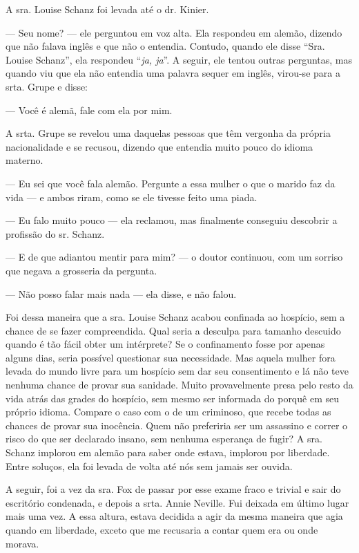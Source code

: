 A sra. Louise Schanz foi levada até o dr. Kinier.

--- Seu nome? --- ele perguntou em voz alta. Ela respondeu em alemão,
dizendo que não falava inglês e que não o entendia. Contudo, quando ele
disse ``Sra. Louise Schanz'', ela respondeu ``\emph{ja, ja}''. A seguir, ele
tentou outras perguntas, mas quando viu que ela não entendia uma palavra
sequer em inglês, virou-se para a srta. Grupe e disse:

--- Você é alemã, fale com ela por mim.

A srta. Grupe se revelou uma daquelas pessoas que têm vergonha da
própria nacionalidade e se recusou, dizendo que entendia muito pouco do
idioma materno.

--- Eu sei que você fala alemão. Pergunte a essa mulher o que o marido
faz da vida --- e ambos riram, como se ele tivesse feito uma piada.

--- Eu falo muito pouco --- ela reclamou, mas finalmente conseguiu
descobrir a profissão do sr. Schanz.

--- E de que adiantou mentir para mim? --- o doutor continuou, com um
sorriso que negava a grosseria da pergunta.

--- Não posso falar mais nada --- ela disse, e não falou.

Foi dessa maneira que a sra. Louise Schanz acabou confinada ao hospício,
sem a chance de se fazer compreendida. Qual seria a desculpa para
tamanho descuido quando é tão fácil obter um intérprete? Se o
confinamento fosse por apenas alguns dias, seria possível questionar sua
necessidade. Mas aquela mulher fora levada do mundo livre para um
hospício sem dar seu consentimento e lá não teve nenhuma chance de
provar sua sanidade. Muito provavelmente presa pelo resto da vida atrás
das grades do hospício, sem mesmo ser informada do porquê em seu próprio
idioma. Compare o caso com o de um criminoso, que recebe todas as
chances de provar sua inocência. Quem não preferiria ser um assassino e
correr o risco do que ser declarado insano, sem nenhuma esperança de
fugir? A sra. Schanz implorou em alemão para saber onde estava, implorou
por liberdade. Entre soluços, ela foi levada de volta até nós sem jamais
ser ouvida.


A seguir, foi a vez da sra. Fox de passar por esse exame fraco e trivial e
sair do escritório condenada, e depois a srta. Annie Neville. Fui deixada
em último lugar mais uma vez. A essa altura, estava decidida a agir da
mesma maneira que agia quando em liberdade, exceto que me recusaria a contar
quem era ou onde morava.

